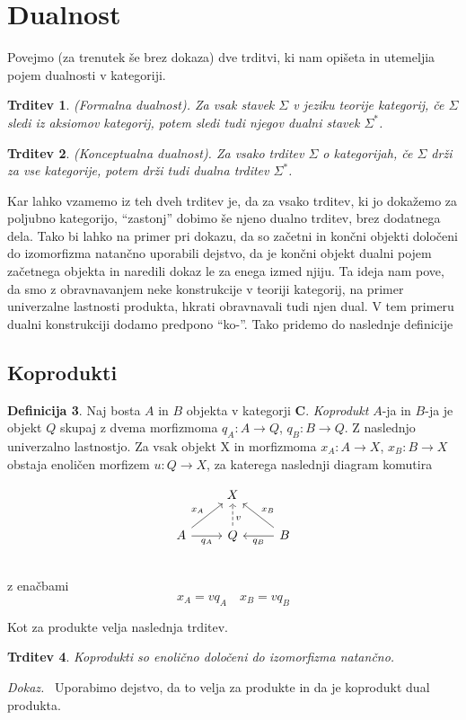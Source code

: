 \documentclass[12pt,a4paper]{book}
\theoremstyle{definition}
\newtheorem{definicija}{Definicija}[chapter]
\theoremstyle{plain}
\newtheorem{trditev}[definicija]{Trditev}
\newenvironment{dokaz}{\emph{Dokaz.}\ }{\hspace{\fill}{$\Box$}}
\theoremstyle{definition}
\theoremstyle{remark}
\newcommand{\cat}[1]{\textbf{#1}}
\begin{document}
\section{Dualnost}
Povejmo (za trenutek še brez dokaza) dve trditvi, ki nam opišeta in utemeljia pojem dualnosti v kategoriji.

\begin{trditev} \textit{(Formalna dualnost)}. 
Za vsak stavek $\Sigma$ v jeziku teorije kategorij, če $\Sigma$ sledi iz aksiomov kategorij, potem sledi tudi njegov dualni stavek $\Sigma^*$.
\end{trditev}

\begin{trditev} \textit{(Konceptualna dualnost)}.
Za vsako trditev $\Sigma$ o kategorijah, če $\Sigma$ drži za vse kategorije, potem drži tudi dualna trditev $\Sigma^*$.
\end{trditev}

Kar lahko vzamemo iz teh dveh trditev je, da za vsako trditev, ki jo dokažemo za poljubno kategorijo, "`zastonj"' dobimo še njeno dualno trditev, brez dodatnega dela. Tako bi lahko na primer pri dokazu, da so začetni in končni objekti določeni do izomorfizma natančno uporabili dejstvo, da je končni objekt dualni pojem začetnega objekta in naredili dokaz le za enega izmed njiju.
Ta ideja nam pove, da smo z obravnavanjem neke konstrukcije v teoriji kategorij, na primer univerzalne lastnosti produkta, hkrati obravnavali tudi njen dual. V tem primeru dualni konstrukciji dodamo predpono "`ko-"'. Tako pridemo do naslednje definicije

\subsection{Koprodukti}
\begin{definicija}
Naj bosta $A$ in $B$ objekta v kategorji $\cat{C}$. \textit{Koprodukt} $A$-ja in $B$-ja je objekt $Q$ skupaj z dvema morfizmoma $q_A : A \to Q$, $q_B : B \to Q$. Z naslednjo univerzalno lastnostjo. Za vsak objekt X in morfizmoma $x_A : A \to X$, $x_B : B \to X$ obstaja enoličen morfizem $u : Q \to X$, za katerega naslednji diagram komutira

$$\begin{tikzcd}
& X & \\
A \ar[ur, "x_A"] \ar[r, "q_A"'] & Q \ar[u, dashed, pos=0.35, "v"']  & B \ar[l, "q_B"] \ar[ul, "x_B"'] \\
\end{tikzcd}$$
z enačbami
$$x_A = v q_A \quad x_B = v q_B$$
\end{definicija}
Kot za produkte velja naslednja trditev.
\begin{trditev}
Koprodukti so enolično določeni do izomorfizma natančno.
\end{trditev}
\begin{dokaz}
Uporabimo dejstvo, da to velja za produkte in da je koprodukt dual produkta.
\end{dokaz}
\end{document}
